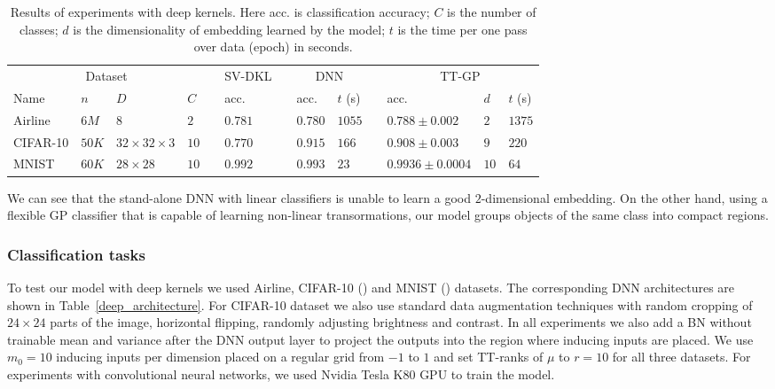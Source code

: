   \begin{table}[t]
    \caption{Results of experiments with deep kernels. Here acc. is classification
            accuracy; $C$ is the number of classes; $d$ is the dimensionality
            of embedding learned by the model; $t$ is the time per one pass over
            data (epoch) in seconds.}
    \label{deep_results}
    \centering
    \begin{tabular}{llll ll llll lll}
      \toprule
      \multicolumn{4}{c}{Dataset}  && SV-DKL &&
      \multicolumn{2}{c}{DNN} &&
      \multicolumn{3}{c}{TT-GP}\\

      \cmidrule{1-4}
      \cmidrule{6-6}
      \cmidrule{8-9}
      \cmidrule{11-13}

      Name & $n$ & $D$ & $C$ &&
      acc. && acc. & $t$ (s) &&
      acc. & $d$ & $t$ (s)
      \\
      \midrule



      Airline & $6M$ & $8$ & $2$ &&
      $0.781$ && $0.780$ & $1055$ &&
      $0.788 \pm 0.002$ & $2$ & $1375$\\

      CIFAR-10 & $50K$ & $32{\times}32{\times}3$ & $10$ &&
      $0.770$ && $0.915$ & $166$ &&
      $0.908 \pm 0.003$ & $9$ & $220$\\

      MNIST & $60K$ & $28{\times}28$ & $10$ &&
      $0.992$ && $0.993$ & $23$ &&
      $0.9936 \pm 0.0004$ & $10$ & $64$\\
      \bottomrule
    \end{tabular}
  \end{table}

  We can see that the stand-alone DNN with linear classifiers is unable
  to learn a good $2$-dimensional embedding.
  On the other hand, using a flexible GP classifier that is capable of learning
  non-linear transormations, our
  model groups objects of the same class into compact regions.

  \subsubsection{Classification tasks}
  To test our model with deep kernels we used Airline,
  CIFAR-10 (\citet{krizhevsky2009}) and
  MNIST (\citet{lecun1998}) datasets. The corresponding DNN architectures are shown
  in Table~\ref{deep_architecture}. For CIFAR-10 dataset we also use standard 
  data augmentation techniques with random cropping of $24 \times 24$
  parts of the image, horizontal flipping, randomly adjusting brightness and contrast. In all experiments we also add a BN without trainable mean and
  variance after the DNN output layer to project the outputs into the region
  where inducing inputs are placed. We use $m_0 = 10$ inducing inputs
  per dimension placed on a regular grid from $-1$ to $1$ and set TT-ranks of 
  $\mu$ to $r = 10$ for all three datasets. For experiments with convolutional neural networks, we
  used Nvidia Tesla K80 GPU to train the model.

